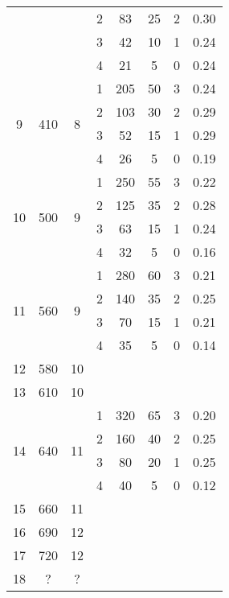 \begin{longtable}[c]{|c|c|c|c|c|c|c|c|}
    & & & 2 & 83 & 25 & 2 & 0.30 \\\cline{4-8}
    & & & 3 & 42 & 10 & 1 & 0.24 \\\cline{4-8}
    & & & 4 & 21 & 5 & 0 & 0.24 \\\hline
    \multirow{4}{*}{9} & \multirow{4}{*}{410} & \multirow{4}{*}{8} & 1 & 205 & 50 & 3 & 0.24 \\\cline{4-8}
    & & & 2 & 103 & 30 & 2 & 0.29 \\\cline{4-8}
    & & & 3 & 52 & 15 & 1 & 0.29 \\\cline{4-8}
    & & & 4 & 26 & 5 & 0 & 0.19 \\\hline
    \multirow{4}{*}{10} & \multirow{4}{*}{500} & \multirow{4}{*}{9} & 1 & 250 & 55 & 3 & 0.22 \\\cline{4-8}
    & & & 2 & 125 & 35 & 2 & 0.28 \\\cline{4-8}
    & & & 3 & 63 & 15 & 1 & 0.24 \\\cline{4-8}
    & & & 4 & 32 & 5 & 0 & 0.16 \\\hline
    \multirow{4}{*}{11} & \multirow{4}{*}{560} & \multirow{4}{*}{9} & 1 & 280 & 60 & 3 & 0.21 \\\cline{4-8}
    & & & 2 & 140 & 35 & 2 & 0.25 \\\cline{4-8}
    & & & 3 & 70 & 15 & 1 & 0.21 \\\cline{4-8}
    & & & 4 & 35 & 5 & 0 & 0.14 \\\hline
    \multirow{1}{*}{12} & \multirow{1}{*}{580} & \multirow{1}{*}{10} & & & & & \\\hline
    \multirow{1}{*}{13} & \multirow{1}{*}{610} & \multirow{1}{*}{10} & & & & & \\\hline
    \multirow{4}{*}{14} & \multirow{4}{*}{640} & \multirow{4}{*}{11} & 1 & 320 & 65 & 3 & 0.20 \\\cline{4-8}
    & & & 2 & 160 & 40 & 2 & 0.25 \\\cline{4-8}
    & & & 3 & 80 & 20 & 1 & 0.25 \\\cline{4-8}
    & & & 4 & 40 & 5 & 0 & 0.12 \\\hline
    \multirow{1}{*}{15} & \multirow{1}{*}{660} & \multirow{1}{*}{11} & & & & & \\\hline
    \multirow{1}{*}{16} & \multirow{1}{*}{690} & \multirow{1}{*}{12} & & & & & \\\hline
    \multirow{1}{*}{17} & \multirow{1}{*}{720} & \multirow{1}{*}{12} & & & & & \\\hline
    \multirow{1}{*}{18} & \multirow{1}{*}{?} & \multirow{1}{*}{?} & & & & & \\\hline

\end{longtable}
